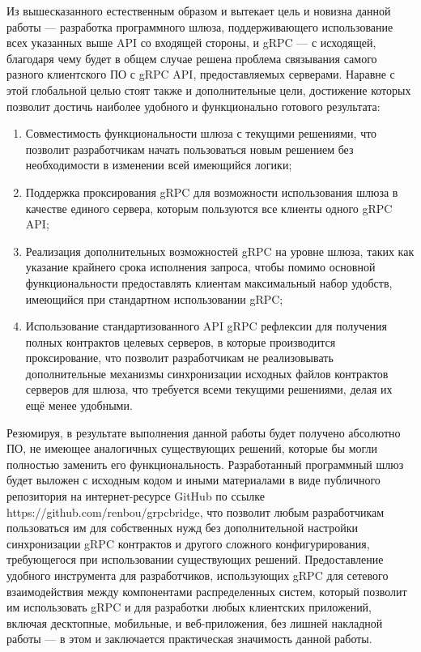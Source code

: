 \documentclass[times]{itmo-student-thesis}
\begin{document}
Из вышесказанного естественным образом и вытекает цель и новизна данной работы — разработка программного шлюза, поддерживающего использование всех указанных выше API со входящей стороны,
и gRPC — с исходящей, благодаря чему будет в общем случае решена проблема связывания самого разного клиентского ПО с gRPC API, предоставляемых серверами.
Наравне с этой глобальной целью стоят также и дополнительные цели, достижение которых позволит достичь наиболее удобного и функционально готового результата:
\begin{enumerate}
    \item Совместимость функциональности шлюза с текущими решениями, что позволит разработчикам начать пользоваться новым решением без необходимости в изменении всей имеющийся логики;
    \item Поддержка проксирования gRPC для возможности использования шлюза в качестве единого сервера, которым пользуются все клиенты одного gRPC API;
    \item Реализация дополнительных возможностей gRPC на уровне шлюза, таких как указание крайнего срока исполнения запроса, чтобы помимо основной функциональности предоставлять клиентам максимальный набор удобств, имеющийся при стандартном использовании gRPC;
    \item Использование стандартизованного API gRPC рефлексии для получения полных контрактов целевых серверов, в которые производится проксирование,
          что позволит разработчикам не реализовывать дополнительные механизмы синхронизации исходных файлов контрактов серверов для шлюза,
          что требуется всеми текущими решениями, делая их ещё менее удобными.
\end{enumerate} 

Резюмируя, в результате выполнения данной работы будет получено абсолютно ПО, не имеющее аналогичных существующих решений, которые бы могли полностью заменить его функциональность.
Разработанный программный шлюз будет выложен с исходным кодом и иными материалами в виде публичного репозитория на интернет-ресурсе GitHub по ссылке https://github.com/renbou/grpcbridge,
что позволит любым разработчикам пользоваться им для собственных нужд без дополнительной настройки синхронизации gRPC контрактов и другого сложного конфигурирования,
требующегося при использовании существующих решений. Предоставление удобного инструмента для разработчиков, использующих gRPC для сетевого взаимодействия между компонентами распределенных систем,
который позволит им использовать gRPC и для разработки любых клиентских приложений, включая десктопные, мобильные, и веб-приложения, без лишней накладной работы — в этом и заключается практическая значимость данной работы.
\end{document}
